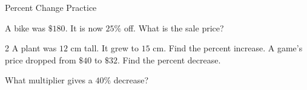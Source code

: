 
\newpage
\begin{stepPractice}{Percent Change Practice}
    \resetProblems

    \prob A bike was $\$180$. It is now $25\%$ off. What is the sale price? \answerBlank[2cm]

    \begin{multicols}{2}
    \prob A plant was $12$ cm tall. It grew to $15$ cm. Find the percent increase. \answerBlank[2cm]
    \prob A game's price dropped from $\$40$ to $\$32$. Find the percent decrease. \answerBlank[2cm]
    \end{multicols}

    \prob What multiplier gives a $40\%$ decrease? \answerBlank[2cm]

\end{stepPractice}
